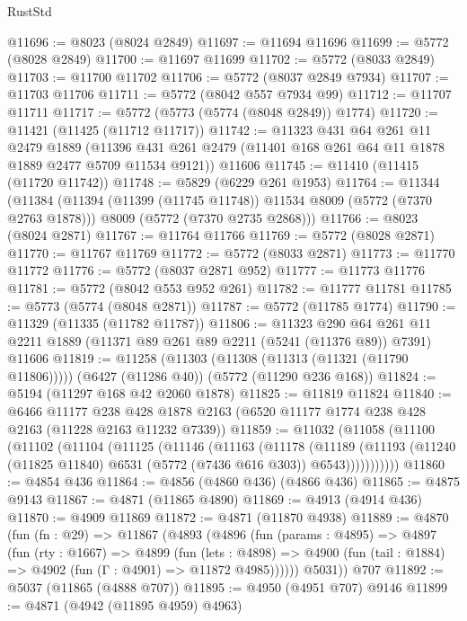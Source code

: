 \begin{lexlean}{RustStd}
\begin{coremodule}
{\begin{coremodule}
{{{{{{{{{{{{{{{{{{{{{{{{{{{{{@11696 := @8023 (@8024 @2849)
@11697 := @11694 @11696
@11699 := @5772 (@8028 @2849)
@11700 := @11697 @11699
@11702 := @5772 (@8033 @2849)
@11703 := @11700 @11702
@11706 := @5772 (@8037 @2849 @7934)
@11707 := @11703 @11706
@11711 := @5772 (@8042 @557 @7934 @99)
@11712 := @11707 @11711
@11717 := @5772 (@5773 (@5774 (@8048 @2849)) @1774)
@11720 := @11421 (@11425 (@11712 @11717))
@11742 := @11323
    @431
    @64
    @261
    @11
    @2479
    @1889
    (@11396 @431 @261 @2479 (@11401 @168 @261 @64 @11 @1878 @1889 @2477 @5709 @11534 @9121))
    @11606
@11745 := @11410 (@11415 (@11720 @11742))
@11748 := @5829 (@6229 @261 @1953)
@11764 := @11344
    (@11384
      (@11394 (@11399 (@11745 @11748)) @11534 @8009 (@5772 (@7370 @2763 @1878)))
      @8009
      (@5772 (@7370 @2735 @2868)))
@11766 := @8023 (@8024 @2871)
@11767 := @11764 @11766
@11769 := @5772 (@8028 @2871)
@11770 := @11767 @11769
@11772 := @5772 (@8033 @2871)
@11773 := @11770 @11772
@11776 := @5772 (@8037 @2871 @952)
@11777 := @11773 @11776
@11781 := @5772 (@8042 @553 @952 @261)
@11782 := @11777 @11781
@11785 := @5773 (@5774 (@8048 @2871))
@11787 := @5772 (@11785 @1774)
@11790 := @11329 (@11335 (@11782 @11787))
@11806 := @11323
    @290
    @64
    @261
    @11
    @2211
    @1889
    (@11371 @89 @261 @89 @2211 (@5241 (@11376 @89)) @7391)
    @11606
@11819 := @11258
    (@11303 (@11308 (@11313 (@11321 (@11790 @11806)))))
    (@6427 (@11286 @40))
    (@5772 (@11290 @236 @168))
@11824 := @5194 (@11297 @168 @42 @2060 @1878)
@11825 := @11819 @11824
@11840 := @6466
    @11177
    @238
    @428
    @1878
    @2163
    (@6520 @11177 @1774 @238 @428 @2163 (@11228 @2163 @11232 @7339))
@11859 := @11032
    (@11058
      (@11100
        (@11102
          (@11104
            (@11125
              (@11146
                (@11163
                  (@11178
                    (@11189
                      (@11193
                        (@11240 (@11825 @11840) @6531 (@5772 (@7436 @616 @303)) @6543)))))))))))
@11860 := @4854 @436
@11864 := @4856 (@4860 @436) (@4866 @436)
@11865 := @4875 @9143
@11867 := @4871 (@11865 @4890)
@11869 := @4913 (@4914 @436)
@11870 := @4909 @11869
@11872 := @4871 (@11870 @4938)
@11889 := @4870
    (fun (fn : @29) =>
    @11867
      (@4893
        (@4896
          (fun (params : @4895) =>
          @4897
            (fun (rty : @1667) =>
            @4899
              (fun (lets : @4898) =>
              @4900 (fun (tail : @1884) => @4902 (fun (Γ : @4901) => @11872 @4985))))))
        @5031))
    @707
@11892 := @5037 (@11865 (@4888 @707))
@11895 := @4950 (@4951 @707) @9146
@11899 := @4871 (@4942 (@11895 @4959) @4963)
}}}}}}}}}}}}}}}}}}}}}}}}}}}}}
\end{coremodule}}
\end{coremodule}
\end{lexlean}
